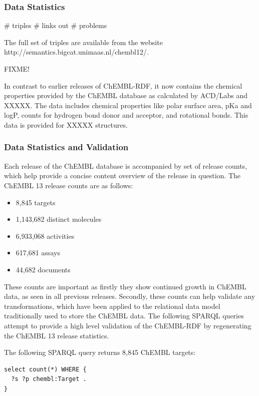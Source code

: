 \documentclass[10pt]{bmc_article}
\newenvironment{bmcformat}{\begin{raggedright}\baselineskip20pt\sloppy\setboolean{publ}{false}}{\end{raggedright}\baselineskip20pt\sloppy}
\begin{document}
\begin{bmcformat}
\subsubsection{Data Statistics}

\# triples
\# links out
\# problems

The full set of triples are available from the website http://semantics.bigcat.unimaas.nl/chembl12/.

FIXME!

In contrast to earlier releases of ChEMBL-RDF, it now contains the chemical properties
provided by the ChEMBL database as calculated by ACD/Labs and XXXXX. The data includes
chemical properties like polar surface area, pKa and logP, counts for hydrogen bond donor
and acceptor, and rotational bonds. This data is provided for XXXXX structures.

\subsubsection*{Data Statistics and Validation}

Each release of the ChEMBL database is accompanied by set of release counts, which help 
provide a concise content overview of the release in question. The ChEMBL 13 release counts
are as follows:
\begin{itemize}
  \item 8,845 targets
  \item 1,143,682 distinct molecules
  \item 6,933,068 activities
  \item 617,681 assays
  \item 44,682 documents
\end{itemize}

These counts are important as firstly they show continued growth in ChEMBL data, as seen 
in all previous releases. Secondly, these counts can help validate any transformations, 
which have been applied to the relational data model traditionally used to store the ChEMBL 
data. The following SPARQL queries attempt to provide a high level validation of the 
ChEMBL-RDF by regenerating the ChEMBL 13 release statistics.

The following SPARQL query returns 8,845 ChEMBL targets:
     
\begin{small}
\begin{verbatim}
select count(*) WHERE {
  ?s ?p chembl:Target .
}
\end{verbatim}
\end{small}


\end{bmcformat}
\end{document}
